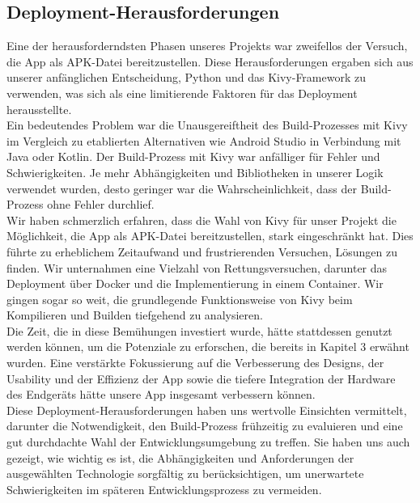 \subsection{Deployment-Herausforderungen}
	\label{ssec:lldeployment}
	
	Eine der herausforderndsten Phasen unseres Projekts war zweifellos der Versuch, die App als APK-Datei bereitzustellen. Diese Herausforderungen ergaben sich aus unserer anfänglichen Entscheidung, Python und das Kivy-Framework zu verwenden, was sich als eine limitierende Faktoren für das Deployment herausstellte. 
	\\
	Ein bedeutendes Problem war die Unausgereiftheit des Build-Prozesses mit Kivy im Vergleich zu etablierten Alternativen wie Android Studio in Verbindung mit Java oder Kotlin. Der Build-Prozess mit Kivy war anfälliger für Fehler und Schwierigkeiten. Je mehr Abhängigkeiten und Bibliotheken in unserer Logik verwendet wurden, desto geringer war die Wahrscheinlichkeit, dass der Build-Prozess ohne Fehler durchlief.
	\\
	Wir haben schmerzlich erfahren, dass die Wahl von Kivy für unser Projekt die Möglichkeit, die App als APK-Datei bereitzustellen, stark eingeschränkt hat. Dies führte zu erheblichem Zeitaufwand und frustrierenden Versuchen, Lösungen zu finden. Wir unternahmen eine Vielzahl von Rettungsversuchen, darunter das Deployment über Docker und die Implementierung in einem Container. Wir gingen sogar so weit, die grundlegende Funktionsweise von Kivy beim Kompilieren und Builden tiefgehend zu analysieren.
	\\
	Die Zeit, die in diese Bemühungen investiert wurde, hätte stattdessen genutzt werden können, um die Potenziale zu erforschen, die bereits in Kapitel 3 erwähnt wurden. Eine verstärkte Fokussierung auf die Verbesserung des Designs, der Usability und der Effizienz der App sowie die tiefere Integration der Hardware des Endgeräts hätte unsere App insgesamt verbessern können.
	\\
	Diese Deployment-Herausforderungen haben uns wertvolle Einsichten vermittelt, darunter die Notwendigkeit, den Build-Prozess frühzeitig zu evaluieren und eine gut durchdachte Wahl der Entwicklungsumgebung zu treffen. Sie haben uns auch gezeigt, wie wichtig es ist, die Abhängigkeiten und Anforderungen der ausgewählten Technologie sorgfältig zu berücksichtigen, um unerwartete Schwierigkeiten im späteren Entwicklungsprozess zu vermeiden.